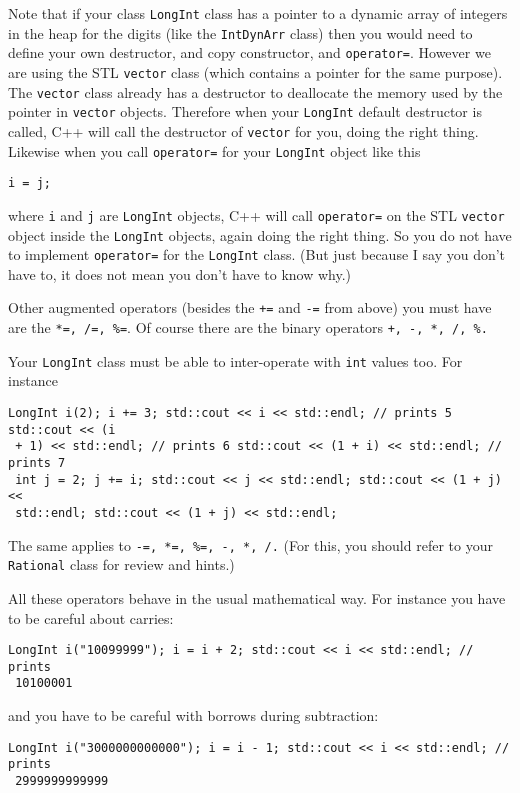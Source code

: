 Note that if your class \verb!LongInt! class has a pointer to a dynamic array
of integers in the heap for the digits (like the \verb!IntDynArr!  class) then
you would need to define your own destructor, and copy constructor, and
\verb!operator=!. However we are using the STL \verb!vector! class (which
contains a pointer for the same purpose). The \verb!vector!  class already has
a destructor to deallocate the memory used by the pointer in \verb!vector!
objects. Therefore when your \verb!LongInt!  default destructor is called, C++
will call the destructor of \verb!vector! for you, doing the right
thing. Likewise when you call \verb!operator=! for your \verb!LongInt! object
like this
\begin{Verbatim}[frame=single,fontsize=\footnotesize]
i = j;
\end{Verbatim}
where \verb!i! and \verb!j! are \verb!LongInt! objects, C++ will call
\verb!operator=! on the STL \verb!vector! object inside the \verb!LongInt!
objects, again doing the right thing. So you do not have to implement
\verb!operator=! for the \verb!LongInt! class. (But just because I say you
don't have to, it does not mean you don't have to know why.)

Other augmented operators (besides the \verb!+=! and \verb!-=! from above) you
must have are the \verb!*=, /=, %=!. Of course there are the binary operators
\verb!+, -, *, /, %.!

Your \verb!LongInt! class must be able to inter-operate with \verb!int!  values
too. For instance
\begin{Verbatim}[fontsize=\footnotesize,frame=single]
LongInt i(2); i += 3; std::cout << i << std::endl; // prints 5 std::cout << (i
 + 1) << std::endl; // prints 6 std::cout << (1 + i) << std::endl; // prints 7
 int j = 2; j += i; std::cout << j << std::endl; std::cout << (1 + j) <<
 std::endl; std::cout << (1 + j) << std::endl;
\end{Verbatim}

The same applies to \verb!-=, *=, %=, -, *, /.! (For this, you should refer to
your \verb!Rational! class for review and hints.)

All these operators behave in the usual mathematical way. For instance you have
to be careful about carries:
\begin{Verbatim}[fontsize=\footnotesize,frame=single]
LongInt i("10099999"); i = i + 2; std::cout << i << std::endl; // prints
 10100001
\end{Verbatim}
and you have to be careful with borrows during subtraction:
\begin{Verbatim}[fontsize=\footnotesize,frame=single]
LongInt i("3000000000000"); i = i - 1; std::cout << i << std::endl; // prints
 2999999999999
\end{Verbatim}

